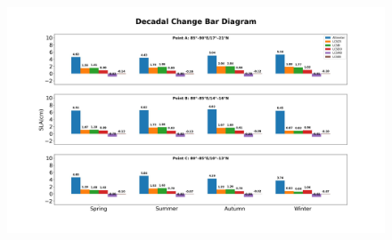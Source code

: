 \documentclass[review]{elsarticle}
\begin{document}
\begin{figure}[!h]
	\begin{center}
		\includegraphics[width=1\textwidth]{./images/point_comparison.jpg}
		\caption {
		}
		\label{fig:paper_09}
	\end{center}
\end{figure}
\clearpage
\end{document}
